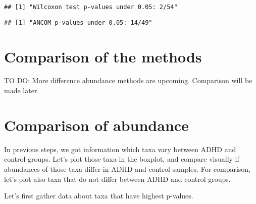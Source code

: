 \documentclass[
  oneside]{book}
\newenvironment{Shaded}{\begin{snugshade}}{\end{snugshade}}
\newcommand{\FunctionTok}[1]{\textcolor[rgb]{0.00,0.00,0.00}{#1}}
\newcommand{\NormalTok}[1]{#1}
\newcommand{\SpecialCharTok}[1]{\textcolor[rgb]{0.00,0.00,0.00}{#1}}
\newcommand{\StringTok}[1]{\textcolor[rgb]{0.31,0.60,0.02}{#1}}
\begin{document}
\begin{verbatim}
## [1] "Wilcoxon test p-values under 0.05: 2/54"
\end{verbatim}

\begin{Shaded}
\end{Shaded}

\begin{verbatim}
## [1] "ANCOM p-values under 0.05: 14/49"
\end{verbatim}

\hypertarget{comparison-of-the-methods}{%
\section{Comparison of the methods}\label{comparison-of-the-methods}}

TO DO: More difference abundance methods are upcoming. Comparison will be made later.

\hypertarget{comparison-of-abundance}{%
\section{Comparison of abundance}\label{comparison-of-abundance}}

In previous steps, we got information which taxa vary between ADHD and control groups.
Let's plot those taxa in the boxplot, and compare visually if abundances of those taxa
differ in ADHD and control samples. For comparison, let's plot also taxa that do not
differ between ADHD and control groups.

Let's first gather data about taxa that have highest p-values.
\end{document}
